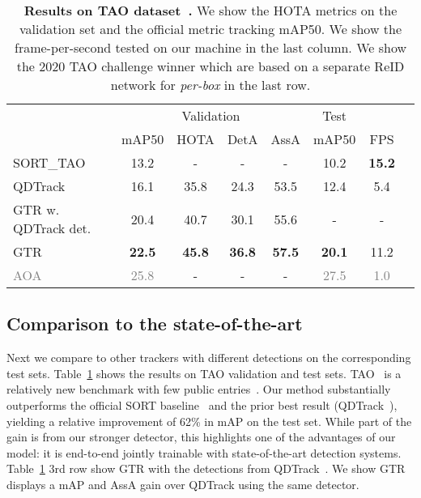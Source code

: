 \documentclass[10pt,twocolumn,letterpaper]{article}
\let\oldsubsection\subsection
\renewcommand{\subsection}[1]{\vspace{-1mm}\oldsubsection{#1}\vspace{-1mm}}
\newcommand{\reftbl}[1]{Table~\ref{tbl:#1}}
\newcommand{\lblsec}[1]{\label{sec:#1}}
\newcommand{\lbltbl}[1]{\label{tbl:#1}}
\begin{document}
\begin{table}
\centering
\small
\begin{tabular}{@{}l@{}c@{\ \ }c@{\ \ }c@{\ \ }c@{\ \ }c@{\ \ }c@{\ \ }c@{}}
\toprule
& \multicolumn{4}{c}{Validation} & \multicolumn{1}{c}{Test} & \\ 
  & mAP\@50 & HOTA & DetA & AssA & mAP\@50 & FPS\\ 
\cmidrule(r){1-1}
\cmidrule(r){2-5}
\cmidrule(r){6-6}
\cmidrule(){7-7}
SORT\_TAO~\cite{dave2020tao} & 13.2 & - & - & - & 10.2 & \bf 15.2 \\
QDTrack~\cite{qdtrack} & 16.1 & 35.8 & 24.3 & 53.5 & 12.4 & 5.4 \\
GTR w. QDTrack det. & 20.4 & 40.7 & 30.1 & 55.6 & - & - \\
GTR & {\bf 22.5} & {\bf 45.8} & {\bf 36.8} & {\bf 57.5} & {\bf 20.1} & 11.2 \\
\cmidrule(r){1-1}
\cmidrule(r){2-5}
\cmidrule(r){6-6}
\cmidrule(){7-7}
\textcolor{gray}{AOA~\cite{Du_2020_TAO}} & \textcolor{gray}{25.8} & - & - & - & \textcolor{gray}{27.5} & \textcolor{gray}{1.0} \\
\bottomrule
\end{tabular}
\vspace{-3mm}
\caption{
\textbf{Results on TAO dataset~\cite{dave2020tao}.} We show the HOTA metrics on the validation set and the official metric tracking mAP50. We show the frame-per-second tested on our machine in the last column. 
We show the 2020 TAO challenge winner which are based on a separate ReID network for \emph{per-box} in the last row.
}
\lbltbl{tao}
\vspace{-5mm}
\end{table}


\subsection{Comparison to the state-of-the-art}
\lblsec{sota}
Next we compare to other trackers with different detections on the corresponding test sets.
\reftbl{tao} shows the results on TAO validation and test sets.
TAO~\cite{dave2020tao} is a relatively new benchmark with few public entries~\cite{dave2020tao,qdtrack}.
Our method substantially outperforms the official SORT baseline~\cite{dave2020tao} and the prior best result (QDTrack~\cite{qdtrack}), yielding a relative improvement of 62\% in mAP on the test set.
While part of the gain is from our stronger detector,
this highlights one of the advantages of our model: it is end-to-end jointly trainable with state-of-the-art detection systems.
\reftbl{tao} 3rd row show GTR with the detections from QDTrack~\cite{qdtrack}.
We show GTR displays a  mAP and  AssA gain over QDTrack using the same detector.
\end{document}
